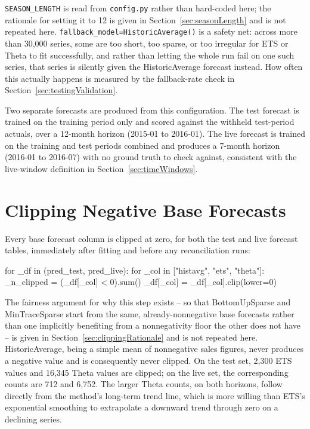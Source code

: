 \texttt{SEASON\_LENGTH} is read from \texttt{config.py} rather than hard-coded here; the rationale for setting it to 12 is given in Section~\ref{sec:seasonLength} and is not repeated here. \texttt{fallback\_model=HistoricAverage()} is a safety net: across more than 30,000 series, some are too short, too sparse, or too irregular for ETS or Theta to fit successfully, and rather than letting the whole run fail on one such series, that series is silently given the HistoricAverage forecast instead. How often this actually happens is measured by the fallback-rate check in Section~\ref{sec:testingValidation}.

Two separate forecasts are produced from this configuration. The test forecast is trained on the training period only and scored against the withheld test-period actuals, over a 12-month horizon (2015-01 to 2016-01). The live forecast is trained on the training and test periods combined and produces a 7-month horizon (2016-01 to 2016-07) with no ground truth to check against, consistent with the live-window definition in Section~\ref{sec:timeWindows}.

\section{Clipping Negative Base Forecasts}
\label{sec:clippingImplementation}

Every base forecast column is clipped at zero, for both the test and live forecast tables, immediately after fitting and before any reconciliation runs:

\begin{Python}
	for _df in (pred_test, pred_live):
	for _col in ["histavg", "ets", "theta"]:
	_n_clipped = (_df[_col] < 0).sum()
	_df[_col] = _df[_col].clip(lower=0)
\end{Python}

The fairness argument for why this step exists -- so that BottomUpSparse and MinTraceSparse start from the same, already-nonnegative base forecasts rather than one implicitly benefiting from a nonnegativity floor the other does not have -- is given in Section~\ref{sec:clippingRationale} and is not repeated here. HistoricAverage, being a simple mean of nonnegative sales figures, never produces a negative value and is consequently never clipped. On the test set, 2,300 ETS values and 16,345 Theta values are clipped; on the live set, the corresponding counts are 712 and 6,752. The larger Theta counts, on both horizons, follow directly from the method's long-term trend line, which is more willing than ETS's exponential smoothing to extrapolate a downward trend through zero on a declining series.

